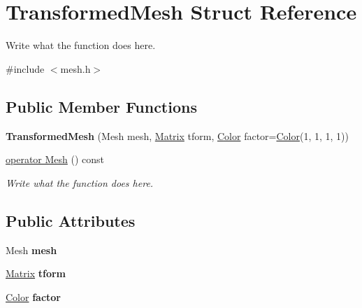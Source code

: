 \hypertarget{structTransformedMesh}{\section{Transformed\+Mesh Struct Reference}
\label{structTransformedMesh}
}


Write what the function does here.  




{\ttfamily \#include $<$mesh.\+h$>$}

\subsection*{Public Member Functions}
\begin{DoxyCompactItemize}
\item 
\hypertarget{structTransformedMesh_a845e75bfa1617afc8bc6e7e75429fe48}{{\bfseries Transformed\+Mesh} (Mesh mesh, \hyperlink{classMatrix}{Matrix} tform, \hyperlink{structColor}{Color} factor=\hyperlink{structColor}{Color}(1, 1, 1, 1))}\label{structTransformedMesh_a845e75bfa1617afc8bc6e7e75429fe48}

\item 
\hyperlink{structTransformedMesh_ab2294d4ace15f6fbcae200d09f5d6910}{operator Mesh} () const 
\begin{DoxyCompactList}\small\item\em Write what the function does here. \end{DoxyCompactList}\end{DoxyCompactItemize}
\subsection*{Public Attributes}
\begin{DoxyCompactItemize}
\item 
\hypertarget{structTransformedMesh_a94d242137b194041a3028e07317d0d8c}{Mesh {\bfseries mesh}}\label{structTransformedMesh_a94d242137b194041a3028e07317d0d8c}

\item 
\hypertarget{structTransformedMesh_a5a1639367ab17697e8245105d18088ad}{\hyperlink{classMatrix}{Matrix} {\bfseries tform}}\label{structTransformedMesh_a5a1639367ab17697e8245105d18088ad}

\item 
\hypertarget{structTransformedMesh_a4b9116e548cf96c33298b72ffb7a76c9}{\hyperlink{structColor}{Color} {\bfseries factor}}\label{structTransformedMesh_a4b9116e548cf96c33298b72ffb7a76c9}

\end{DoxyCompactItemize}


